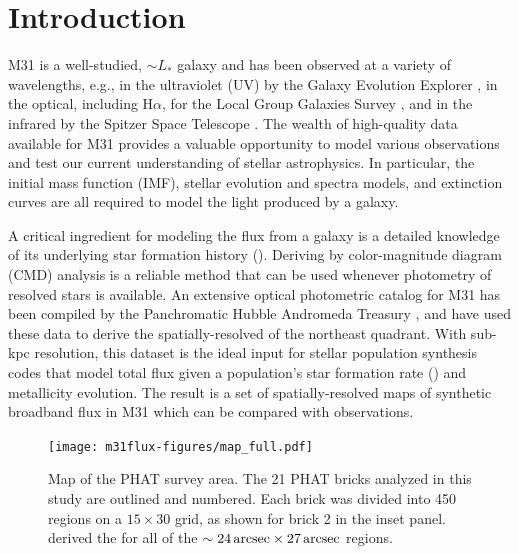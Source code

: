 \documentclass[iop, tighten]{emulateapj}
\begin{document}





\section{Introduction}

M31 is a well-studied, $\sim L_\ast$ galaxy and has been observed at a variety
of wavelengths, e.g., in the ultraviolet (UV) by the Galaxy Evolution Explorer
\citep[GALEX;][]{Morrissey:2007}, in the optical, including H$\alpha$, for the
Local Group Galaxies Survey \citep{Massey:2006}, and in the infrared by the
Spitzer Space Telescope \citep{Gordon:2006}. The wealth of high-quality data
available for M31 provides a valuable opportunity to model various observations
and test our current understanding of stellar astrophysics. In particular, the
initial mass function (IMF), stellar evolution and spectra models, and
extinction curves are all required to model the light produced by a galaxy.

A critical ingredient for modeling the flux from a galaxy is a detailed
knowledge of its underlying star formation history (\sfh{}). Deriving 
by color-magnitude diagram (CMD) analysis is a reliable method that can be used
whenever photometry of resolved stars is available. An extensive optical
photometric catalog for M31 has been compiled by the Panchromatic Hubble
Andromeda Treasury \citep[PHAT][]{Dalcanton:2012}, and \citet{Lewis:2014} have
used these data to derive the spatially-resolved \sfh{} of the northeast
quadrant. With sub-kpc resolution, this \sfh{} dataset is the ideal input for
stellar population synthesis codes that model total flux given a population's
star formation rate (\sfr{}) and metallicity evolution. The result is a set of
spatially-resolved maps of synthetic broadband flux in M31 which can be
compared with observations.


\begin{figure}
\centering
\texttt{[image: m31flux-figures/map\_full.pdf]}
\caption[PHAT survey map.]{Map of the PHAT survey area. The 21 PHAT bricks
    analyzed in this study are outlined and numbered. Each brick was divided
    into 450 regions on a $15 \times 30$ grid, as shown for brick 2 in the
    inset panel. \citet{Lewis:2014} derived the  for all of the $\sim
    24\,\mathrm{arcsec} \times 27\,\mathrm{arcsec}$ regions.
}
\label{fig:map}
\end{figure}
\end{document}
